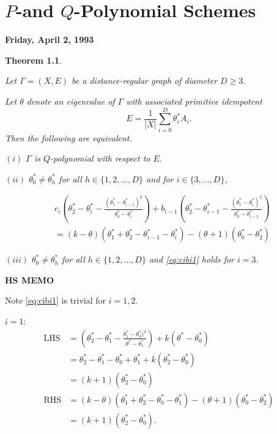\documentclass[
]{book}
\newtheorem{theorem}{Theorem}[chapter]
\theoremstyle{definition}
\theoremstyle{definition}
\theoremstyle{definition}
\theoremstyle{definition}
\theoremstyle{remark}
\begin{document}
\hypertarget{lec27}{%
\chapter{\texorpdfstring{\(P\)-and \(Q\)-Polynomial Schemes}{P-and Q-Polynomial Schemes}}\label{lec27}}

\textbf{Friday, April 2, 1993}

\begin{theorem}
\protect\hypertarget{thm:p-and-q}{}\label{thm:p-and-q}

Let \(\Gamma = (X,E)\) be a distance-regular graph of diameter \(D\geq 3\).

Let \(\theta\) denote an eigenvalue of \(\Gamma\) with associated primitive idempotent
\[E = \frac{1}{|X|}\sum_{i=0}^D \theta^*_iA_i.\]
Then the following are equivalent.

\((i)\) \(\Gamma\) is \(Q\)-polynomial with respect to \(E\).

\((ii)\) \(\theta^*_0\neq \theta^*_h\) for all \(h\in \{1, 2, \ldots, D\}\) and for \(i\in \{3, \ldots, D\}\),

\begin{align}
& c_i\left(\theta^*_2 - \theta^*_i - \frac{(\theta^*_1-\theta^*_{i-1})^2}{\theta^*_0-\theta^*_i}\right) + b_{i-1}\left(\theta^*_2 - \theta^*_{i-1} - \frac{(\theta^*_1-\theta^*_{i})^2}{\theta^*_0-\theta^*_{i-1}}\right)\\
& = (k-\theta)(\theta^*_1+\theta^*_2-\theta^*_{i-1}-\theta^*_i)-(\theta+1)(\theta^*_0-\theta^*_2) \label{eq:cibi1}
\end{align}

\((iii)\) \(\theta^*_0\neq \theta^*_h\) for all \(h\in \{1, 2, \ldots, D\}\) and \eqref{eq:cibi1} holds for \(i=3\).

\end{theorem}

\textbf{HS MEMO}

Note \eqref{eq:cibi1} is trivial for \(i = 1, 2\).

\(i=1\):
\begin{align}
\mathrm{LHS} & = \left(\theta^*_2-\theta^*_1 - \frac{\theta^*_1-\theta^*_0)^2}{\theta^*-\theta^*_1}\right)+ k(\theta^*-\theta^*_0)\\
& = \theta^*_2-\theta^*_1 - \theta^*_0 + \theta^*_1 + k(\theta_2^*-\theta^*_0)\\
& = (k+1)(\theta^*_2-\theta^*_0)\\
\mathrm{RHS} & = (k-\theta)(\theta^*_1+\theta^*_2-\theta^*_0-\theta^*_1)-(\theta+1)(\theta^*_0-\theta^*_2)\\
& = (k+1)(\theta^*_2-\theta^*_0).
\end{align}
\end{document}

